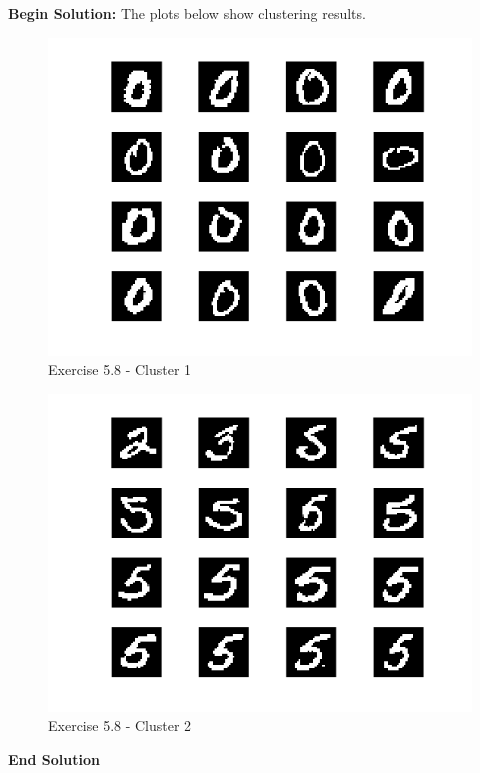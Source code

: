 \documentclass[twoside]{article}
\begin{document}
\textbf{Begin Solution:}
The plots below show clustering results.
\begin{figure}[H]
\begin{center}
\includegraphics[width=\textwidth]{./exercise_5_8/Cluster1.png}
\end{center}
\caption{Exercise 5.8 - Cluster 1}
\end{figure}
\begin{figure}[H]
\begin{center}
\includegraphics[width=\textwidth]{./exercise_5_8/Cluster2.png}
\end{center}
\caption{Exercise 5.8 - Cluster 2}
\end{figure}  
\textbf{End Solution}
\end{document}

